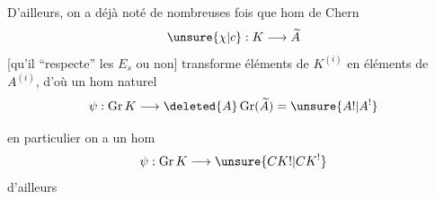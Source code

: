 D'ailleurs, on a déjà noté de nombreuses fois que  hom de Chern
\[
\unsure{\chi|c}:K\longrightarrow\widetilde A
\]
[qu'il ``respecte'' les $E_s$ ou non] transforme éléments de $K^{(i)}$ en éléments de $A^{(i)}$, d'où un hom naturel 
\[
\psi:\operatorname{Gr}K\longrightarrow\deleted{A}\operatorname{Gr}(\widetilde A)=\unsure{A!|A^!}
\]
\margin{[$\simeq A$ additivement\deleted{]} en degrés $\ne0$]}

en particulier on a un hom
\[
\psi:\operatorname{Gr}K\longrightarrow\unsure{CK!|CK^!}
\]
 d'ailleurs
